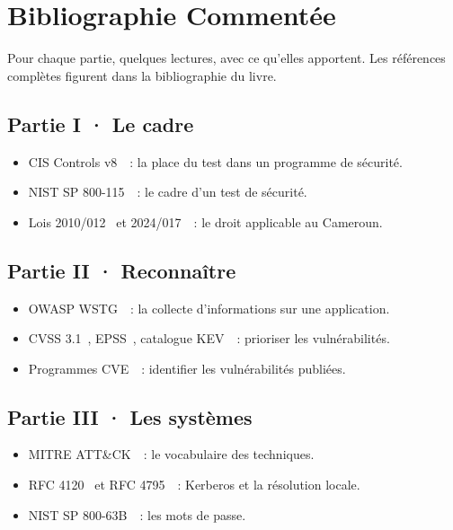 
\chapter{Bibliographie Commentée}
\label{ann:bibliographie}

Pour chaque partie, quelques lectures, avec ce qu'elles apportent. Les
références complètes figurent dans la bibliographie du livre.

\section*{Partie I · Le cadre}
\begin{itemize}
    \item CIS Controls v8~\cite{cis2021controls}~: la place du test dans un programme de sécurité.
    \item NIST SP 800-115~\cite{nist800115}~: le cadre d'un test de sécurité.
    \item Lois 2010/012~\cite{loi2010012} et 2024/017~\cite{loi2024017}~: le droit applicable au Cameroun.
\end{itemize}

\section*{Partie II · Reconnaître}
\begin{itemize}
    \item OWASP WSTG~\cite{owaspwstg}~: la collecte d'informations sur une application.
    \item CVSS 3.1~\cite{first2019cvss31}, EPSS~\cite{firstepss}, catalogue KEV~\cite{cisakev}~: prioriser les vulnérabilités.
    \item Programmes CVE~\cite{mitrecve}~: identifier les vulnérabilités publiées.
\end{itemize}

\section*{Partie III · Les systèmes}
\begin{itemize}
    \item MITRE ATT\&CK~\cite{mitreattack}~: le vocabulaire des techniques.
    \item RFC 4120~\cite{rfc4120} et RFC 4795~\cite{rfc4795}~: Kerberos et la résolution locale.
    \item NIST SP 800-63B~\cite{nist80063b}~: les mots de passe.
\end{itemize}

